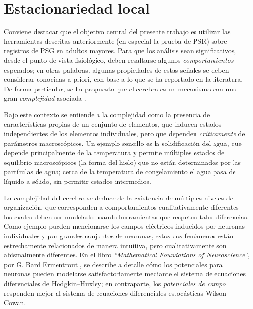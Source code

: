 \documentclass[12pt,letterpaper]{book}
\begin{document}

\section{Estacionariedad local}
\label{sec:est_local}


Conviene destacar que el objetivo central del presente trabajo es utilizar las herramientas descritas anteriormente (en especial la prueba de PSR) sobre registros de PSG en adultos mayores.
%
Para que los análisis sean significativos, desde el punto de vista fisiológico, deben resaltarse algunos \textit{comportamientos} esperados; en otras palabras, algunas propiedades de estas señales  se deben considerar conocidas a priori, con base a lo que se ha reportado en la literatura.
%
De forma particular, se ha propuesto que el cerebro es un mecanismo con una gran \textit{complejidad} asociada \cite{Werner09}.

Bajo este contexto se entiende a la complejidad como la presencia de características propias de un conjunto de elementos, 
que inducen {estados} independientes de los elementos individuales, pero que dependen \textit{críticamente} de parámetros macroscópicos.
%
Un ejemplo sencillo es la solidificación del agua, que depende principalmente de la temperatura y permite múltiples estados de equilibrio macroscópicos (la forma del hielo) que no están determinados por las partículas de agua; cerca de la temperatura de congelamiento el agua pasa de líquido a sólido, sin permitir estados intermedios.

La complejidad del cerebro se deduce de la existencia de múltiples niveles de organización, que corresponden a comportamientos cualitativamente diferentes --los cuales deben ser modelado usando herramientas que respeten tales diferencias.
%
Como ejemplo pueden mencionarse los campos eléctricos inducidos por neuronas individuales y por grandes conjuntos de neuronas; estos dos fenómenos están estrechamente relacionados de manera intuitiva, pero cualitativamente son abismalmente diferentes.
%
En el libro \textit{``Mathematical Foundations of Neuroscience"}, por G. Bard Ermentrout \cite{Ermentrout10}, se describe a detalle cómo los potenciales para neuronas pueden modelarse satisfactoriamente mediante el sistema de ecuaciones diferenciales de Hodgkin--Huxley; en contraparte, los \textit{potenciales de campo} responden mejor al sistema de ecuaciones diferenciales estocásticas Wilson--Cowan.
\end{document}
